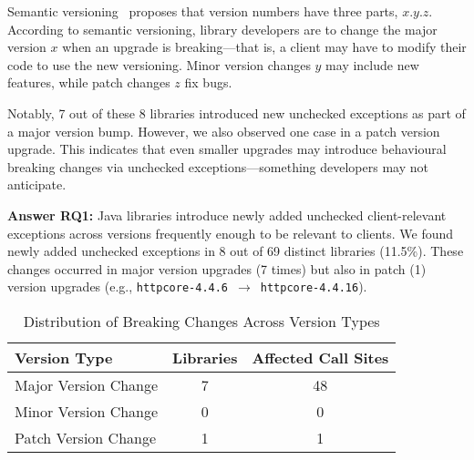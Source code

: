 Semantic versioning~\cite{preston-werner23:_seman_version} proposes that version numbers have three parts, $x.y.z$. According to semantic versioning, library developers are to change the major version $x$ when an upgrade is breaking---that is, a client may have to modify their code to use the new versioning. Minor version changes $y$ may include new features, while patch changes $z$ fix bugs.

Notably, 7 out of these 8 libraries introduced new unchecked exceptions as part of a major version bump. However, we also observed one case in a patch version upgrade. This indicates that even smaller upgrades may introduce behavioural breaking changes via unchecked exceptions—something developers may not anticipate.

\vspace{1em}
\begin{tcolorbox}[colback=gray!10, colframe=black]
\textbf{Answer RQ1:} Java libraries introduce newly added unchecked client-relevant exceptions across versions frequently enough to be relevant to clients. We found newly added unchecked exceptions in 8 out of 69 distinct libraries (11.5\%). These changes occurred in major version upgrades (7 times) but also in patch (1) version upgrades (e.g., \texttt{httpcore-4.4.6}~$\rightarrow$~\texttt{httpcore-4.4.16}).
\end{tcolorbox}
\vspace{1em}

\begin{table}[h]
\centering
\caption{Distribution of Breaking Changes Across Version Types}
\label{tab:version-distribution}
\begin{tabular}{lcc}
\toprule
\textbf{Version Type} & \textbf{Libraries} & \textbf{Affected Call Sites} \\
\midrule
Major Version Change & 7 & 48 \\
Minor Version Change & 0 & 0 \\
Patch Version Change & 1 & 1 \\
\bottomrule
\end{tabular}
\end{table}

